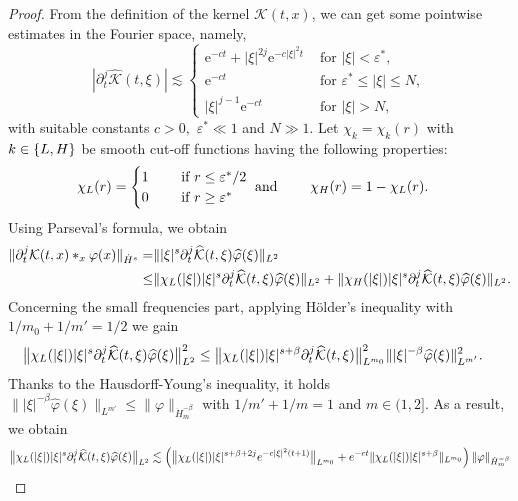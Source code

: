 \documentclass[10pt,a4paper]{amsart}
\begin{document}
\begin{proof}
From the definition of the kernel $\mathcal{K}(t,x)$, we can get some pointwise estimates in the Fourier space, namely,
$$
|\partial_t^j \widehat{\mathcal{K}}(t,\xi)|\lesssim \begin{cases}
\mathrm{e}^{-ct}+|\xi|^{2j}\mathrm{e}^{-c|\xi|^2t}&\text{ for } |\xi|< \varepsilon^*,\\
\mathrm{e}^{-ct}&\text{ for } \varepsilon^* \leq|\xi|\leq N,\\
|\xi|^{j-1}\mathrm{e}^{-ct}&\text{ for } |\xi|> N,
\end{cases}
$$
with suitable constants $c>0,$  $\varepsilon^* \ll 1$ and $ N \gg 1$. Let $\chi_k= \chi_k(r)$ with $k\in\{\rm L,H\}$ be smooth cut-off functions having the following properties:
\begin{align*}
&\chi_{\rm L}(r)=
\begin{cases}
1 &\quad \text{ if }r\le \varepsilon^*/2 \\
0 &\quad \text{ if }r\ge \varepsilon^*
\end{cases}
\text{ and } \qquad
\chi_{\rm H}(r)= 1 -\chi_{\rm L}(r).
\end{align*}
Using Parseval's formula, we obtain
\begin{align*}
\|\partial_t^j \mathcal{K}(t,x)\ast_x \varphi(x)\|_{\dot{H}^s} =& \||\xi|^s \partial_t^j \widehat{\mathcal{K}}(t,\xi) \widehat{\varphi}(\xi)\|_{L^2} \\
\leq & \|\chi_{\rm L}(|\xi|)|\xi|^s \partial_t^j \widehat{\mathcal{K}}(t,\xi) \widehat{\varphi}(\xi)\|_{L^2} + \| \chi_{\rm H}(|\xi|)|\xi|^s \partial_t^j \widehat{\mathcal{K}}(t,\xi) \widehat{\varphi}(\xi)\|_{L^2}.  
\end{align*}
Concerning the small frequencies part,
applying H\"{o}lder's inequality with $1/m_0 + 1/m' = 1/2$ we gain
\begin{align*}
    \big\|\chi_{\rm L}(|\xi|)|\xi|^{s}\partial_t^j\widehat{\mathcal{K}}(t,\xi) \widehat{\varphi}(\xi)\big\|^2_{L^2} 
     &\leq \big\|\chi_{\rm L}(|\xi|)|\xi|^{s+\beta}\partial_t^j\widehat{\mathcal{K}}(t,\xi)\big\|_{L^{m_0}}^2 \||\xi|^{-\beta}\widehat{\varphi}(\xi)\|_{L^{m'}}^2.
\end{align*}
Thanks to the Hausdorff-Young's inequality, it holds $\||\xi|^{-\beta}\widehat{\varphi}(\xi)\|_{L^{m'}} \leq \|\varphi\|_{\dot{H}_m^{-\beta}}$ with $1/m' + 1/m = 1$  and $m \in (1,2]$. As a result, we obtain
\begin{align*}
     \big\|\chi_{\rm L}(|\xi|)|\xi|^{s}\partial_t^j\widehat{\mathcal{K}}(t,\xi) \widehat{\varphi}(\xi)\big\|_{L^2} &\lesssim \left(\big\|\chi_{\rm L}(|\xi|)|\xi|^{s+\beta+2j} e^{-c|\xi|^{2}(t+1)}\big\|_{L^{m_0}} + e^{-ct} \|\chi_{\rm L}(|\xi|) |\xi|^{s+\beta}\|_{L^{m_0}}\right) \|\varphi\|_{\dot{H}_m^{-\beta}}\\

\end{align*}
\end{proof}
\end{document}

